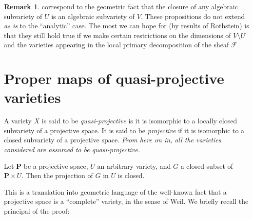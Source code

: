 \documentclass{article}
\theoremstyle{plain}
\newenvironment{lemma}[1]
    {\renewcommand\theinnercustomlemma{#1}\innercustomlemma}
    {\endinnercustomlemma}
\theoremstyle{definition}
\newtheorem*{remark}{Remark}
\newcommand{\sh}{\mathscr}
\newcommand{\PP}{\mathbf{P}}
\begin{document}
\begin{remark}
   correspond to the geometric fact that the closure of any algebraic subvariety of $U$ is an algebraic subvariety of $V$.
  These propositions do not extend \emph{as is} to the ``analytic'' case.
  The most we can hope for (by results of Rothstein) is that they still hold true if we make certain restrictions on the dimensions of $V\setminus U$ and the varieties appearing in the local primary decomposition of the sheaf $\sh{F}$.
\end{remark}


\section{Proper maps of quasi-projective varieties}
\label{section2}

A variety $X$ is said to be \emph{quasi-projective} is it is isomorphic to a locally closed subvariety of a projective space.
It is said to be \emph{projective} if it is isomorphic to a closed subvariety of a projective space.
\emph{From here on in, all the varieties considered are assumed to be quasi-projective.}

\begin{lemma}{3}
\label{lemma3}
  Let $\PP$ be a projective space, $U$ an arbitrary variety, and $G$ a closed subset of $\PP\times U$.
  Then the projection of $G$ in $U$ is closed.
\end{lemma}

This is a translation into geometric language of the well-known fact that a projective space is a ``complete'' variety, in the sense of Weil.
We briefly recall the principal of the proof:
\end{document}
